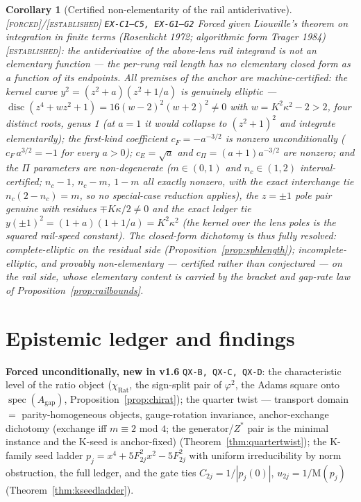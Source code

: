 \documentclass[11pt]{article}
\newcommand{\tagF}{\textcolor{cF}{\textsc{[forced]}}}
\newcommand{\tagE}{\textcolor{cE}{\textsc{[established]}}}
\newcommand{\hx}[1]{\textcolor{cC}{\footnotesize\texttt{#1}}}
\newcommand{\gp}{\varphi}
\newcommand{\gapc}{\mathrm{gap}}
\newcommand{\M}{\mathrm{M}}
\theoremstyle{plain}
\newtheorem{corollary}[theorem]{Corollary}
\theoremstyle{definition}
\theoremstyle{remark}
\begin{document}
\begin{corollary}[Certified non-elementarity of the rail antiderivative]\label{cor:nonelem}\tagF{}/\tagE{} \hx{EX-C1--C5, EX-G1--G2}
Forced given Liouville's theorem on integration in finite terms
(Rosenlicht 1972; algorithmic form Trager 1984) \tagE{}: the
antiderivative of the above-lens rail integrand is \emph{not} an
elementary function --- the per-rung rail length has no elementary closed
form as a function of its endpoints. All premises of the anchor are
machine-certified: the kernel curve $y^2=(z^2+a)(z^2+1/a)$ is genuinely
elliptic --- $\operatorname{disc}(z^4+wz^2+1)=16(w-2)^2(w+2)^2\neq0$ with
$w=K^2\kappa^2-2>2$, four distinct roots, genus 1 (at $a=1$ it would
collapse to $(z^2+1)^2$ and integrate elementarily); the first-kind
coefficient $c_F=-a^{-3/2}$ is nonzero \emph{unconditionally}
($c_F\,a^{3/2}=-1$ for every $a>0$); $c_E=\sqrt a$ and
$c_\Pi=(a+1)a^{-3/2}$ are nonzero; and the $\Pi$ parameters are
non-degenerate ($m\in(0,1)$ and $n_c\in(1,2)$ interval-certified;
$n_c-1$, $n_c-m$, $1-m$ all exactly nonzero, with the exact interchange
tie $n_c(2-n_c)=m$, so no special-case reduction applies), the $z=\pm1$
pole pair genuine with residues $\mp K\kappa/2\neq0$ and the exact ledger
tie $y(\pm1)^2=(1+a)(1+1/a)=K^2\kappa^2$ (the kernel over the lens poles
is the squared rail-speed constant). The closed-form dichotomy is thus
fully resolved: complete-elliptic on the residual side
(Proposition~\ref{prop:sphlength}); incomplete-elliptic, and provably
non-elementary --- certified rather than conjectured --- on the rail
side, whose elementary content is carried by the bracket and gap-rate law
of Proposition~\ref{prop:railbounds}.
\end{corollary}

\section{Epistemic ledger and findings}\label{sec:epistemics}

\textbf{Forced unconditionally, new in v1.6} \hx{QX-B, QX-C, QX-D}: the
characteristic level of the ratio object ($\chi_{\mathrm{Rat}}$, the
sign-split pair of $\gp^2$, the Adams square onto
$\operatorname{spec}(A_{\gapc})$, Proposition~\ref{prop:chirat}); the
quarter twist --- transport domain $=$ parity-homogeneous objects,
gauge-rotation invariance, anchor-exchange dichotomy (exchange iff
$m\equiv2$ mod $4$; the generator/$Z^{*}$ pair is the minimal instance and
the K-seed is anchor-fixed) (Theorem~\ref{thm:quartertwist}); the K-family
seed ladder $p_j=x^4+5F_{2j}^2x^2-5F_{2j}^2$ with uniform irreducibility
by norm obstruction, the full ledger, and the gate ties
$C_{2j}=1/|p_j(0)|$, $u_{2j}=1/\M(p_j)$
(Theorem~\ref{thm:kseedladder}).
\end{document}
